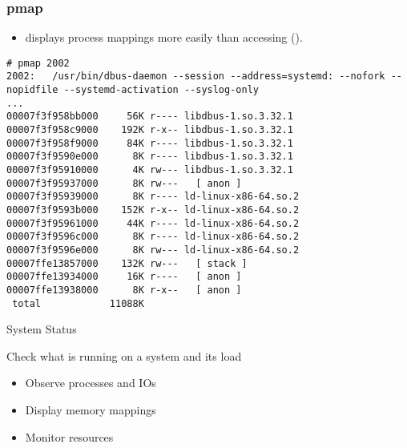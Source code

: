 \begin{frame}[fragile]
  \frametitle{pmap}
  \begin{itemize}
    \item {} displays process mappings more easily than
          accessing  ().
  \end{itemize}
  \begin{block}{}
    \begin{verbatim}
# pmap 2002
2002:   /usr/bin/dbus-daemon --session --address=systemd: --nofork --nopidfile --systemd-activation --syslog-only
...
00007f3f958bb000     56K r---- libdbus-1.so.3.32.1
00007f3f958c9000    192K r-x-- libdbus-1.so.3.32.1
00007f3f958f9000     84K r---- libdbus-1.so.3.32.1
00007f3f9590e000      8K r---- libdbus-1.so.3.32.1
00007f3f95910000      4K rw--- libdbus-1.so.3.32.1
00007f3f95937000      8K rw---   [ anon ]
00007f3f95939000      8K r---- ld-linux-x86-64.so.2
00007f3f9593b000    152K r-x-- ld-linux-x86-64.so.2
00007f3f95961000     44K r---- ld-linux-x86-64.so.2
00007f3f9596c000      8K r---- ld-linux-x86-64.so.2
00007f3f9596e000      8K rw--- ld-linux-x86-64.so.2
00007ffe13857000    132K rw---   [ stack ]
00007ffe13934000     16K r----   [ anon ]
00007ffe13938000      8K r-x--   [ anon ]
 total            11088K
    \end{verbatim}
  \end{block}
\end{frame}

\setuplabframe
{System Status}
{
  Check what is running on a system and its load
  \begin{itemize}
    \item Observe processes and IOs
    \item Display memory mappings
    \item Monitor resources
  \end{itemize}
}